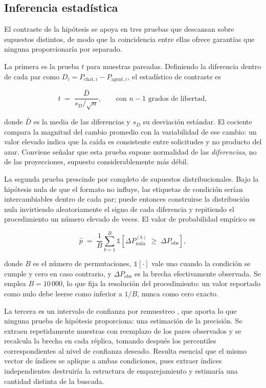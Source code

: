 \subsection{Inferencia estadística}

El contraste de la hipótesis se apoya en tres pruebas que descansan sobre
supuestos distintos, de modo que la coincidencia entre ellas ofrece garantías
que ninguna proporcionaría por separado.

La primera es la prueba $t$ para muestras pareadas. Definiendo la diferencia
dentro de cada par como $D_i = P_{\text{chat},i} - P_{\text{agent},i}$, el
estadístico de contraste es

\begin{equation}
  t \;=\; \frac{\bar{D}}{s_D/\sqrt{n}},
  \qquad \text{con } n-1 \text{ grados de libertad},
  \label{eq:t-pareado}
\end{equation}

\noindent
donde $\bar{D}$ es la media de las diferencias y $s_D$ su desviación estándar.
El cociente compara la magnitud del cambio promedio con la variabilidad de ese
cambio: un valor elevado indica que la caída es consistente entre solicitudes y
no producto del azar. Conviene señalar que esta prueba supone normalidad de las
\textit{diferencias}, no de las proyecciones, supuesto considerablemente más
débil.

La segunda prueba prescinde por completo de supuestos distribucionales. Bajo la
hipótesis nula de que el formato no influye, las etiquetas de condición serían
intercambiables dentro de cada par; puede entonces construirse la distribución
nula invirtiendo aleatoriamente el signo de cada diferencia y repitiendo el
procedimiento un número elevado de veces. El valor de probabilidad empírico es

\begin{equation}
  \hat{p} \;=\; \frac{1}{B}\sum_{b=1}^{B}
  \mathbb{1}\!\left[\Delta P^{(b)}_{\text{nula}} \;\ge\; \Delta P_{\text{obs}}\right],
  \label{eq:permutacion}
\end{equation}

\noindent
donde $B$ es el número de permutaciones, $\mathbb{1}[\cdot]$ vale uno cuando la
condición se cumple y cero en caso contrario, y $\Delta P_{\text{obs}}$ es la
brecha efectivamente observada. Se emplea $B = 10\,000$, lo que fija la
resolución del procedimiento: un valor reportado como nulo debe leerse como
inferior a $1/B$, nunca como cero exacto.

La tercera es un intervalo de confianza por remuestreo \parencite{efron1979},
que aporta lo que ninguna prueba de hipótesis proporciona: una estimación de la
precisión. Se extraen repetidamente muestras con reemplazo de los pares
observados y se recalcula la brecha en cada réplica, tomando después los
percentiles correspondientes al nivel de confianza deseado. Resulta esencial
que el mismo vector de índices se aplique a ambas condiciones, pues extraer
índices independientes destruiría la estructura de emparejamiento y estimaría
una cantidad distinta de la buscada.

